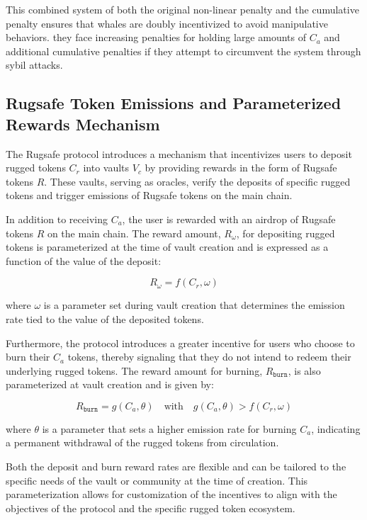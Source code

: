 \documentclass{article}
\begin{document}
This combined system of both the original non-linear penalty and the cumulative penalty ensures that whales are doubly incentivized to avoid manipulative behaviors. they face increasing penalties for holding large amounts of $C_a$ and additional cumulative penalties if they attempt to circumvent the system through sybil attacks.






\subsection{Rugsafe Token Emissions and Parameterized Rewards Mechanism}

The Rugsafe protocol introduces a mechanism that incentivizes users to deposit rugged tokens $C_r$ into vaults $V_c$ by providing rewards in the form of Rugsafe tokens $R$. These vaults, serving as oracles, verify the deposits of specific rugged tokens and trigger emissions of Rugsafe tokens on the main chain.

In addition to receiving $C_a$, the user is rewarded with an airdrop of Rugsafe tokens $R$ on the main chain. The reward amount, $R_{\omega}$, for depositing rugged tokens is parameterized at the time of vault creation and is expressed as a function of the value of the deposit:

\[
R_{\omega} = f(C_r, \omega)
\]

where $\omega$ is a parameter set during vault creation that determines the emission rate tied to the value of the deposited tokens.

Furthermore, the protocol introduces a greater incentive for users who choose to burn their $C_a$ tokens, thereby signaling that they do not intend to redeem their underlying rugged tokens. The reward amount for burning, $R_{\texttt{burn}}$, is also parameterized at vault creation and is given by:

\[
R_{\texttt{burn}} = g(C_a, \theta) \quad \text{with} \quad g(C_a, \theta) > f(C_r, \omega)
\]

where $\theta$ is a parameter that sets a higher emission rate for burning $C_a$, indicating a permanent withdrawal of the rugged tokens from circulation.

Both the deposit and burn reward rates are flexible and can be tailored to the specific needs of the vault or community at the time of creation. This parameterization allows for customization of the incentives to align with the objectives of the protocol and the specific rugged token ecosystem.
\end{document}
